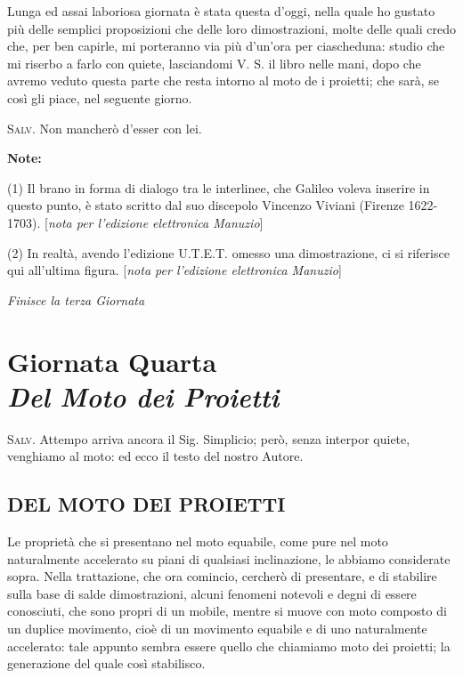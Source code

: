 \documentclass[11pt,twoside,openany]{book}
\newcommand{\speaker}[1]{\textcolor{rubric}{\textsc{#1}}\space}
\begin{document}
Lunga ed assai laboriosa giornata è stata questa d'oggi, nella quale ho gustato più delle semplici proposizioni che delle loro dimostrazioni, molte delle quali credo che, per ben capirle, mi porteranno via più d'un'ora per ciascheduna: studio che mi riserbo a farlo con quiete, lasciandomi V. S. il libro nelle mani, dopo che avremo veduto questa parte che resta intorno al moto de i proietti; che sarà, se così gli piace, nel seguente giorno.

\speaker{Salv.} Non mancherò d'esser con lei.

\textbf{Note:}

(1) Il brano in forma di dialogo tra le interlinee, che Galileo voleva inserire in questo punto, è stato scritto dal suo discepolo Vincenzo Viviani (Firenze 1622-1703). [\emph{nota per l'edizione elettronica Manuzio}]

(2) In realtà, avendo l'edizione U.T.E.T. omesso una dimostrazione, ci si riferisce qui all'ultima figura. [\emph{nota per l'edizione elettronica Manuzio}]


\vspace{1.5em}\begin{center}\large\itshape Finisce la terza Giornata\end{center}

\chapter*{Giornata Quarta\\{\normalsize\itshape Del Moto dei Proietti}}
\speaker{Salv.} Attempo arriva ancora il Sig. Simplicio; però, senza interpor quiete, venghiamo al moto: ed ecco il testo del nostro Autore.


\section*{DEL MOTO DEI PROIETTI}

Le proprietà che si presentano nel moto equabile, come pure nel moto naturalmente accelerato su piani di qualsiasi inclinazione, le abbiamo considerate sopra. Nella trattazione, che ora comincio, cercherò di presentare, e di stabilire sulla base di salde dimostrazioni, alcuni fenomeni notevoli e degni di essere conosciuti, che sono propri di un mobile, mentre si muove con moto composto di un duplice movimento, cioè di un movimento equabile e di uno naturalmente accelerato: tale appunto sembra essere quello che chiamiamo moto dei proietti; la generazione del quale così stabilisco.
\end{document}
